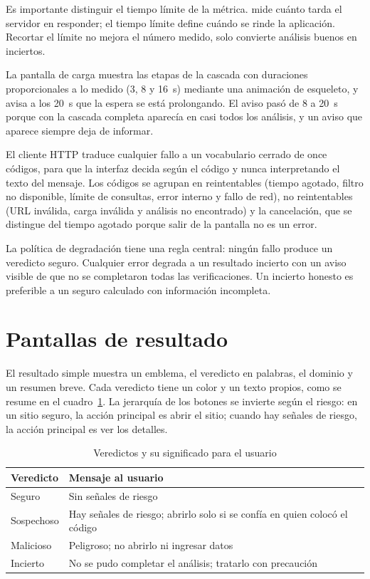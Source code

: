 Es importante distinguir el tiempo límite de la métrica. \ttotal{} mide cuánto tarda el servidor en responder; el tiempo límite define cuándo se rinde la aplicación. Recortar el límite no mejora el número medido, solo convierte análisis buenos en inciertos.

La pantalla de carga muestra las etapas de la cascada con duraciones proporcionales a lo medido (3, 8 y 16~s) mediante una animación de esqueleto, y avisa a los 20~s que la espera se está prolongando. El aviso pasó de 8 a 20~s porque con la cascada completa aparecía en casi todos los análisis, y un aviso que aparece siempre deja de informar.

El cliente HTTP traduce cualquier fallo a un vocabulario cerrado de once códigos, para que la interfaz decida según el código y nunca interpretando el texto del mensaje. Los códigos se agrupan en reintentables (tiempo agotado, filtro no disponible, límite de consultas, error interno y fallo de red), no reintentables (URL inválida, carga inválida y análisis no encontrado) y la cancelación, que se distingue del tiempo agotado porque salir de la pantalla no es un error.

La política de degradación tiene una regla central: ningún fallo produce un veredicto seguro. Cualquier error degrada a un resultado incierto con un aviso visible de que no se completaron todas las verificaciones. Un incierto honesto es preferible a un seguro calculado con información incompleta.

\section{Pantallas de resultado}

El resultado simple muestra un emblema, el veredicto en palabras, el dominio y un resumen breve. Cada veredicto tiene un color y un texto propios, como se resume en el cuadro~\ref{tab:veredictos}. La jerarquía de los botones se invierte según el riesgo: en un sitio seguro, la acción principal es abrir el sitio; cuando hay señales de riesgo, la acción principal es ver los detalles.

\begin{table}[H]
	\centering
	\caption{Veredictos y su significado para el usuario}
	\label{tab:veredictos}
	\begin{tabular}{@{}>{\raggedright\arraybackslash}p{2.6cm}>{\raggedright\arraybackslash}p{10.4cm}@{}}
		\toprule
		\textbf{Veredicto} & \textbf{Mensaje al usuario} \\
		\midrule
		Seguro & Sin señales de riesgo \\
		Sospechoso & Hay señales de riesgo; abrirlo solo si se confía en quien colocó el código \\
		Malicioso & Peligroso; no abrirlo ni ingresar datos \\
		Incierto & No se pudo completar el análisis; tratarlo con precaución \\
		\bottomrule
	\end{tabular}
\end{table}

